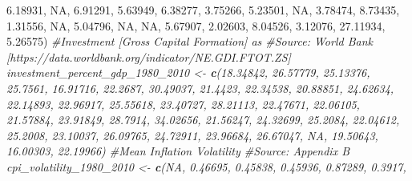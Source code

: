 \documentclass[11pt, oneside]{article}   	%
\newenvironment{Shaded}{\begin{snugshade}}{\end{snugshade}}
\newcommand{\CommentTok}[1]{\textcolor[rgb]{0.56,0.35,0.01}{\textit{#1}}}
\newcommand{\DecValTok}[1]{\textcolor[rgb]{0.00,0.00,0.81}{#1}}
\newcommand{\FloatTok}[1]{\textcolor[rgb]{0.00,0.00,0.81}{#1}}
\newcommand{\KeywordTok}[1]{\textcolor[rgb]{0.13,0.29,0.53}{\textbf{#1}}}
\newcommand{\NormalTok}[1]{#1}
\newcommand{\OtherTok}[1]{\textcolor[rgb]{0.56,0.35,0.01}{#1}}
\newcommand{\StringTok}[1]{\textcolor[rgb]{0.31,0.60,0.02}{#1}}
\begin{document}
\begin{Shaded}
\begin{Highlighting}[]
{                           \FloatTok{6.18931}\NormalTok{, }\OtherTok{NA}\NormalTok{, }\FloatTok{6.91291}\NormalTok{, }\FloatTok{5.63949}\NormalTok{, }\FloatTok{6.38277}\NormalTok{, }\FloatTok{3.75266}\NormalTok{,}
                           \FloatTok{5.23501}\NormalTok{, }\OtherTok{NA}\NormalTok{, }\FloatTok{3.78474}\NormalTok{, }\FloatTok{8.73435}\NormalTok{, }\FloatTok{1.31556}\NormalTok{, }\OtherTok{NA}\NormalTok{, }\FloatTok{5.04796}\NormalTok{,}
                           \OtherTok{NA}\NormalTok{, }\OtherTok{NA}\NormalTok{, }\FloatTok{5.67907}\NormalTok{, }\FloatTok{2.02603}\NormalTok{, }\FloatTok{8.04526}\NormalTok{, }\FloatTok{3.12076}\NormalTok{, }\FloatTok{27.11934}\NormalTok{, }\FloatTok{5.26575}\NormalTok{)}
\CommentTok{#Investment [Gross Capital Formation] as % of gdp}
\CommentTok{#Source: World Bank [https://data.worldbank.org/indicator/NE.GDI.FTOT.ZS]}
\NormalTok{investment_percent_gdp_}\DecValTok{1980}\NormalTok{_}\DecValTok{2010}\NormalTok{ <-}\StringTok{ }\KeywordTok{c}\NormalTok{(}\FloatTok{18.34842}\NormalTok{, }\FloatTok{26.57779}\NormalTok{, }\FloatTok{25.13376}\NormalTok{, }\FloatTok{25.7561}\NormalTok{, }
                                      \FloatTok{16.91716}\NormalTok{, }\FloatTok{22.2687}\NormalTok{, }\FloatTok{30.49037}\NormalTok{, }\FloatTok{21.4423}\NormalTok{,}
                                      \FloatTok{22.34538}\NormalTok{, }\FloatTok{20.88851}\NormalTok{, }\FloatTok{24.62634}\NormalTok{, }\FloatTok{22.14893}\NormalTok{,}
                                      \FloatTok{22.96917}\NormalTok{, }\FloatTok{25.55618}\NormalTok{, }\FloatTok{23.40727}\NormalTok{, }\FloatTok{28.21113}\NormalTok{,}
                                      \FloatTok{22.47671}\NormalTok{, }\FloatTok{22.06105}\NormalTok{, }\FloatTok{21.57884}\NormalTok{, }\FloatTok{23.91849}\NormalTok{,}
                                      \FloatTok{28.7914}\NormalTok{, }\FloatTok{34.02656}\NormalTok{, }\FloatTok{21.56247}\NormalTok{, }\FloatTok{24.32699}\NormalTok{,}
                                      \FloatTok{25.2084}\NormalTok{, }\FloatTok{22.04612}\NormalTok{, }\FloatTok{25.2008}\NormalTok{, }\FloatTok{23.10037}\NormalTok{, }
                                      \FloatTok{26.09765}\NormalTok{, }\FloatTok{24.72911}\NormalTok{, }\FloatTok{23.96684}\NormalTok{, }\FloatTok{26.67047}\NormalTok{, }\OtherTok{NA}\NormalTok{, }
                                      \FloatTok{19.50643}\NormalTok{, }\FloatTok{16.00303}\NormalTok{, }\FloatTok{22.19966}\NormalTok{)}
\CommentTok{#Mean Inflation Volatility }
\CommentTok{#Source: Appendix B}
\NormalTok{cpi_volatility_}\DecValTok{1980}\NormalTok{_}\DecValTok{2010}\NormalTok{ <-}\StringTok{ }\KeywordTok{c}\NormalTok{(}\OtherTok{NA}\NormalTok{, }\FloatTok{0.46695}\NormalTok{, }\FloatTok{0.45838}\NormalTok{, }\FloatTok{0.45936}\NormalTok{, }\FloatTok{0.87289}\NormalTok{, }\FloatTok{0.3917}\NormalTok{,}
}}
\end{Highlighting}
\end{Shaded}
\end{document}
